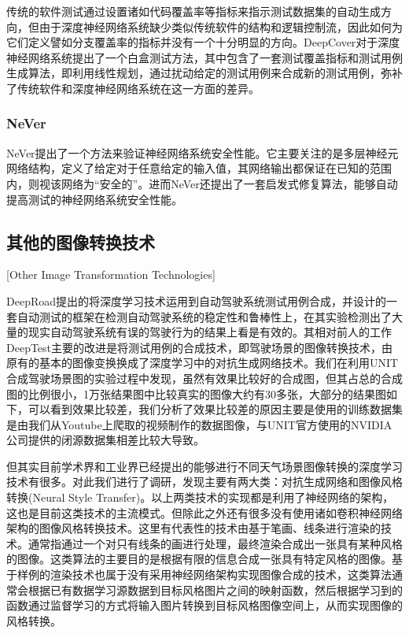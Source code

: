 传统的软件测试通过设置诸如代码覆盖率等指标来指示测试数据集的自动生成方向，但由于深度神经网络系统缺少类似传统软件的结构和逻辑控制流，因此如何为它们定义譬如分支覆盖率的指标并没有一个十分明显的方向。DeepCover\cite{DeepCover}对于深度神经网络系统提出了一个白盒测试方法，其中包含了一套测试覆盖指标和测试用例生成算法，即利用线性规划，通过扰动给定的测试用例来合成新的测试用例，弥补了传统软件和深度神经网络系统在这一方面的差异。

\subsubsection{NeVer}

NeVer\cite{dsv}提出了一个方法来验证神经网络系统安全性能。它主要关注的是多层神经元网络结构，定义了给定对于任意给定的输入值，其网络输出都保证在已知的范围内，则视该网络为“安全的”。进而NeVer还提出了一套启发式修复算法，能够自动提高测试的神经网络系统安全性能。

\subsection{其他的图像转换技术}[Other Image Transformation Technologies]

DeepRoad提出的将深度学习技术运用到自动驾驶系统测试用例合成，并设计的一套自动测试的框架在检测自动驾驶系统的稳定性和鲁棒性上，在其实验检测出了大量的现实自动驾驶系统有误的驾驶行为的结果\cite{DeepRoad}上看是有效的。其相对前人的工作DeepTest主要的改进是将测试用例的合成技术，即驾驶场景的图像转换技术，由原有的基本的图像变换换成了深度学习中的对抗生成网络技术。我们在利用UNIT合成驾驶场景图的实验过程中发现，虽然有效果比较好的合成图，但其占总的合成图的比例很小，1万张结果图中比较真实的图像大约有30多张，大部分的结果图如下，可以看到效果比较差，我们分析了效果比较差的原因主要是使用的训练数据集是由我们从Youtube上爬取的视频制作的数据图像，与UNIT官方使用的NVIDIA公司提供的闭源数据集相差比较大导致。

但其实目前学术界和工业界已经提出的能够进行不同天气场景图像转换的深度学习技术有很多。对此我们进行了调研，发现主要有两大类：对抗生成网络和图像风格转换(Neural Style Transfer)。以上两类技术的实现都是利用了神经网络的架构，这也是目前这类技术的主流模式。但除此之外还有很多没有使用诸如卷积神经网络架构的图像风格转换技术。这里有代表性的技术由基于笔画、线条进行渲染的技术。通常指通过一个对只有线条的画进行处理，最终渲染合成出一张具有某种风格的图像。这类算法的主要目的是根据有限的信息合成一张具有特定风格的图像。基于样例的渲染技术也属于没有采用神经网络架构实现图像合成的技术，这类算法通常会根据已有数据学习源数据到目标风格图片之间的映射函数，然后根据学习到的函数通过监督学习的方式将输入图片转换到目标风格图像空间上，从而实现图像的风格转换。

